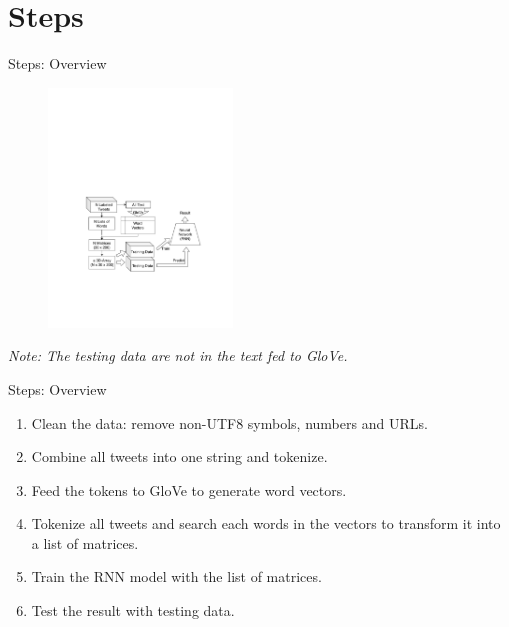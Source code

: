 \documentclass{beamer}
\begin{document}
\section{Steps}%
\label{sec:steps}

\begin{frame}{Steps: Overview}
    \begin{figure}[h]
	    \includegraphics[trim={2cm 6cm 0 12.5cm},clip,height=2.5in]{img/flow_chart.pdf}
        \label{fig:flowchart}
    \end{figure}
    \textit{Note: The testing data are not in the text fed to GloVe.}
\end{frame}

\begin{frame}{Steps: Overview}
	\begin{enumerate}
		\item Clean the data: remove non-UTF8 symbols, numbers and URLs.
		\item Combine all tweets into one string and tokenize.
		\item Feed the tokens to GloVe to generate word vectors.
		\item Tokenize all tweets and search each words in the vectors to transform it into a list of matrices.
		\item Train the RNN model with the list of matrices.
		\item Test the result with testing data.
	\end{enumerate}	
\end{frame}
\end{document}
